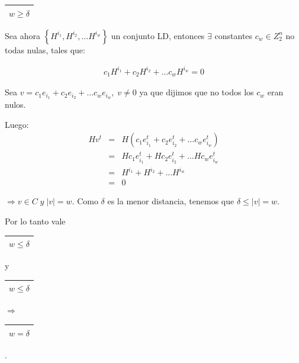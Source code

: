 \documentclass[12pt,a4paper]{report}
\newcounter{neq}
\begin{document}
			\vspace{3mm}
			\begin{tabular}{|c|} \hline $w \geq \delta $ \\\hline \end{tabular}
			\vspace{3mm}
			\par Sea ahora $\left\lbrace H^{i_{1}}, H^{i_{2}}, \dotsc H^{i_{w}} \right\rbrace$ un conjunto LD, entonces $\exists$ constantes $c_{w} \in Z_{2}^{n}$ no todas nulas, tales que:

			\begin{eqnarray}
				\nonumber c_{1} H^{i_{1}} + c_{2} H^{i_{2}} + \dotsc c_{w} H^{i_{w}} = 0
			\end{eqnarray}

			\par Sea $v = c_{1} e_{i_{1}} + c_{2} e_{i_{2}} + \dotsc c_{w} e_{i_{w}} , \; v \neq 0$ ya que dijimos que no todos los $c_{w}$ eran nulos.

			\vspace{3mm}			
			\par Luego:
			\begin{eqnarray}
				\nonumber H v^{t} &=& H (c_{1} e_{i_{1}}^{t} + c_{2} e_{i_{2}}^{t} + \dotsc c_{w} e_{i_{w}}^{t}) \\
				\nonumber &=& H c_{1} e_{i_{1}}^{t} + H c_{2} e_{i_{2}}^{t} + \dotsc H c_{w} e_{i_{w}}^{t} \\
				\nonumber &=& H^{i_{1}} + H^{i_{2}} + \dotsc H^{i_{w}} \\
				\nonumber &=& 0
			\end{eqnarray}
			\par $\Rightarrow v \in C \; y \; \lvert v \rvert = w$. Como $\delta$ es la menor distancia, tenemos que $\delta \leq \lvert v \rvert = w$.

			\vspace{5mm}
			\par Por lo tanto vale \begin{tabular}{|c|} \hline $w \leq \delta $ \\ \hline \end{tabular} y \begin{tabular}{|c|} \hline $w \leq \delta $ \\ \hline \end{tabular} $\Rightarrow$ \begin{tabular}{|c|} \hline $w = \delta $ \\ \hline \end{tabular}.
\end{document}
